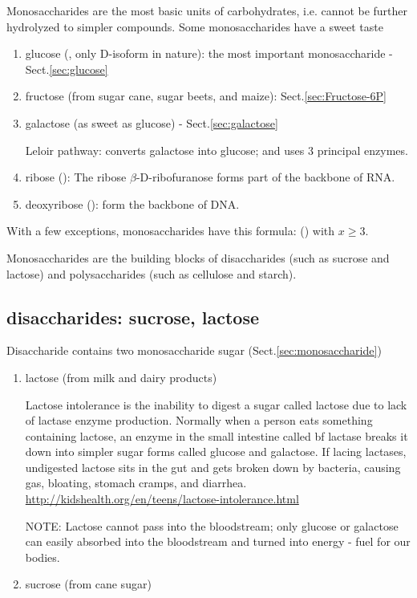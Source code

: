 Monosaccharides are the most basic units of carbohydrates, i.e. cannot be
further  hydrolyzed to simpler compounds. Some monosaccharides have a sweet
taste
\begin{enumerate}
  \item glucose (, only D-isoform in nature):
  the most important monosaccharide - Sect.\ref{sec:glucose}
  
  \item fructose (from sugar cane, sugar beets, and maize):
  Sect.\ref{sec:Fructose-6P}
  
  \item galactose (as sweet as glucose) - Sect.\ref{sec:galactose}
  
Leloir pathway: converts galactose into glucose; and uses 3 principal enzymes.



   \item ribose (): \label{sec:ribose}
   The ribose $\beta$-D-ribofuranose forms part of the backbone of RNA. 
   
     
   \item deoxyribose (): \label{sec:deoxyribose}  form the backbone
   of DNA. 
\end{enumerate}
With a few exceptions, monosaccharides have this formula: ()
with $x \ge 3$.

Monosaccharides are the building blocks of disaccharides (such as sucrose and
lactose) and polysaccharides (such as cellulose and starch). 

\subsection{disaccharides: sucrose, lactose}
\label{sec:disaccharide}

Disaccharide contains two monosaccharide sugar (Sect.\ref{sec:monosaccharide})

\begin{enumerate}
  \item lactose (from milk and dairy products)
  \label{sec:lactose}
  
Lactose intolerance is the inability to digest a sugar called lactose due to
lack of lactase enzyme production.
Normally when a person eats something containing lactose, an enzyme in the small
intestine called {bf lactase} breaks it down into simpler sugar forms called
glucose and galactose. \label{sec:lactase} If lacing lactases, undigested
lactose sits in the gut and gets broken down by bacteria, causing gas, bloating,
stomach cramps, and diarrhea.
\url{http://kidshealth.org/en/teens/lactose-intolerance.html}

NOTE: Lactose cannot pass into the bloodstream; only glucose or galactose
can easily absorbed into the bloodstream and turned into energy - fuel for our
bodies.
  
  \item sucrose (from cane sugar)
\end{enumerate}

